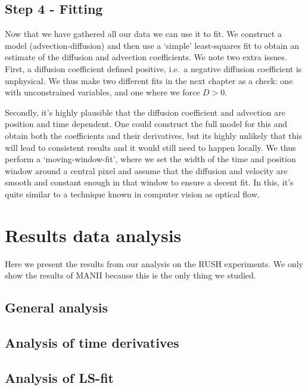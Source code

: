 \documentclass[12pt,a4paper,]{harvard-thesis}
\begin{document}
\hypertarget{step-4---fitting}{%
\section{Step 4 - Fitting}\label{step-4---fitting}}

Now that we have gathered all our data we can use it to fit. We
construct a model (advection-diffusion) and then use a `simple'
least-squares fit to obtain an estimate of the diffusion and advection
coefficients. We note two extra issues. First, a diffusion coefficient
defined positive, i.e.~a negative diffusion coefficient is unphysical.
We thus make two different fits in the next chapter as a check: one with
unconstrained variables, and one where we force \(D>0\).

Secondly, it's highly plausible that the diffusion coefficient and
advection are position and time dependent. One could construct the full
model for this and obtain both the coefficients and their derivatives,
but its highly unlikely that this will lead to consistent results and it
would still need to happen locally. We thus perform a
`moving-window-fit', where we set the width of the time and position
window around a central pixel and assume that the diffusion and velocity
are smooth and constant enough in that window to ensure a decent fit. In
this, it's quite similar to a technique known in computer vision as
optical flow.

\hypertarget{results-data-analysis}{%
\chapter{Results data analysis}\label{results-data-analysis}}

Here we present the results from our analysis on the RUSH experiments.
We only show the results of MANII because this is the only thing we
studied.

\hypertarget{general-analysis}{%
\section{General analysis}\label{general-analysis}}

\hypertarget{analysis-of-time-derivatives}{%
\section{Analysis of time
derivatives}\label{analysis-of-time-derivatives}}

\hypertarget{analysis-of-ls-fit}{%
\section{Analysis of LS-fit}\label{analysis-of-ls-fit}}
\end{document}
